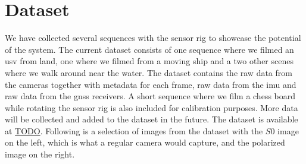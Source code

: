 \section{Dataset}
We have collected several sequences with the sensor rig to showcase the potential of the system.
The current dataset consists of one sequence where we filmed an \gls{usv} from land, one where we filmed from a moving ship and a two other scenes where we walk around near the water.
The dataset contains the raw data from the cameras together with metadata for each frame, raw data from the \gls{imu} and raw data from the \gls{gnss} receivers.
A short sequence where we film a chess board while rotating the sensor rig is also included for calibration purposes.
More data will be collected and added to the dataset in the future.
The dataset is available at \url{TODO}.
Following is a selection of images from the dataset with the $S0$ image on the left, which is what a regular camera would capture, and the polarized image on the right.

